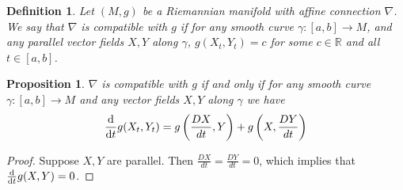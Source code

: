 \documentclass[a4paper]{article}
\newtheorem*{prop}{Proposition}
\newtheorem*{defn}{Definition}
\begin{document}
\begin{defn}
  Let $(M,g)$ be a Riemannian manifold with affine connection $\nabla$. We say that $\nabla$ is compatible with $g$ if for any smooth curve $\gamma: [a,b] \rightarrow M$, and any parallel vector fields $X,Y$ along $\gamma$, $g(X_t,Y_t) = c$ for some $c \in \mathds{R}$ and all $t \in [a,b]$. 
\end{defn}

\begin{prop}
  $\nabla$ is compatible with $g$ if and only if for any smooth curve $\gamma: [a,b] \rightarrow M$ and any vector fields $X,Y$ along $\gamma$ we have 
  \[
    \dv{t} g(X_t, Y_t)  = g \left( \frac{DX}{dt}, Y \right) + g \left( X, \frac{DY}{dt} \right)
  \]
\end{prop}

\begin{proof}
  Suppose $X,Y$ are parallel.  Then $\frac{DX}{dt} = \frac{DY}{dt} = 0$, which implies that$\dv{t} g(X,Y) = 0$.
\end{proof}
\end{document}
